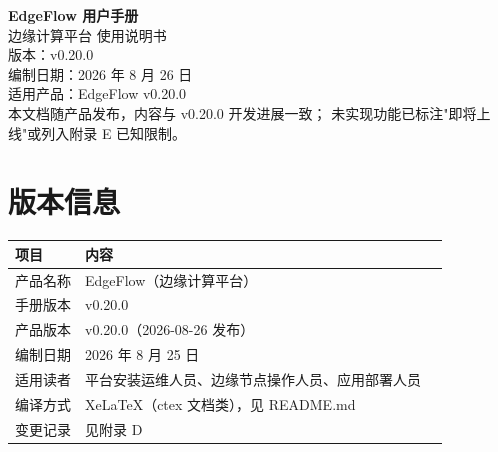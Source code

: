\documentclass[11pt,a4paper,openany]{ctexbook}
\begin{document}
\begin{titlepage}
\centering
\vspace*{5cm}
{\Huge\bfseries EdgeFlow 用户手册}\\[1.2em]
{\Large 边缘计算平台 使用说明书}\\[3em]
{\large 版本：v0.20.0}\\[0.6em]
{\large 编制日期：2026 年 8 月 26 日}\\[0.6em]
{\large 适用产品：EdgeFlow v0.20.0}\\[6cm]
{\small 本文档随产品发布，内容与 v0.20.0 开发进展一致；\newline
未实现功能已标注"即将上线"或列入附录 E 已知限制。}
\end{titlepage}

\chapter*{版本信息}
\begin{tabularx}{\textwidth}{l l Y}
\toprule
\textbf{项目} & \textbf{内容} \\
\midrule
产品名称 & EdgeFlow（边缘计算平台） \\
手册版本 & v0.20.0 \\
产品版本 & v0.20.0（2026-08-26 发布） \\
编制日期 & 2026 年 8 月 25 日 \\
适用读者 & 平台安装运维人员、边缘节点操作人员、应用部署人员 \\
编译方式 & XeLaTeX（ctex 文档类），见 README.md \\
变更记录 & 见附录 D \\
\bottomrule
\end{tabularx}

\tableofcontents










\appendix

\end{document}

